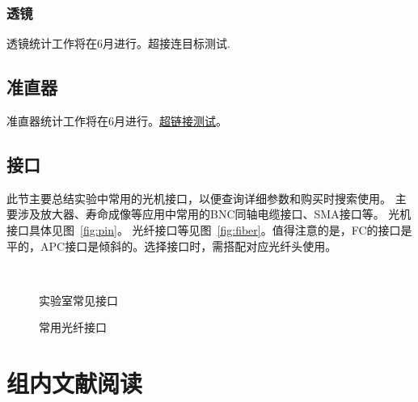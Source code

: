 \documentclass[cn,11pt,chinese]{elegantbook}
\begin{document}
\subsection{透镜}
透镜统计工作将在6月进行。\hypertarget{fig1}{超接连目标测试}.
\section{准直器}
准直器统计工作将在6月进行。\hyperlink{fig1}{超链接测试}。

\section{接口}
此节主要总结实验中常用的光机接口，以便查询详细参数和购买时搜索使用。
主要涉及放大器、寿命成像等应用中常用的BNC同轴电缆接口、SMA接口等。
光机接口具体见图~\vref{fig:pin}。
光纤接口等见图~\vref{fig:fiber}。值得注意的是，FC的接口是平的，APC接口是倾斜的。选择接口时，需搭配对应光纤头使用。
\begin{figure}[ht]
	\centering
	 \quad
	 \quad
	 \quad
	 \\
	\caption{实验室常见接口} 
	\label{fig:pin}
\end{figure}

\begin{figure}[ht]
	\centering
	 \quad
	  \quad
	\caption{常用光纤接口} 
	\label{fig:fiber}
\end{figure}

\chapter{组内文献阅读}
\end{document}
